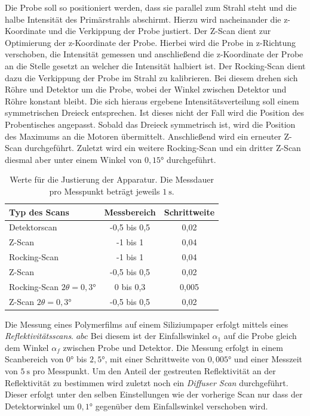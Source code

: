 Die Probe soll so positioniert werden, dass sie parallel zum Strahl steht und die halbe Intensität des Primärstrahls abschirmt.
Hierzu wird nacheinander die z-Koordinate und die Verkippung der Probe justiert.
Der Z-Scan dient zur Optimierung der z-Koordinate der Probe.
Hierbei wird die Probe in z-Richtung verschoben, die Intensität gemessen und anschließend die z-Koordinate der Probe an die Stelle gesetzt an welcher die Intensität halbiert ist.
Der Rocking-Scan dient dazu die Verkippung der Probe im Strahl zu kalibrieren.
Bei diesem drehen sich Röhre und Detektor um die Probe, wobei der Winkel zwischen Detektor und Röhre konstant bleibt.
Die sich hieraus ergebene Intensitätsverteilung soll einem symmetrischen Dreieck entsprechen.
Ist dieses nicht der Fall wird die Position des Probentisches angepasst.
Sobald das Dreieck symmetrisch ist, wird die Position des Maximums an die Motoren übermittelt.
Anschließend wird ein erneuter Z-Scan durchgeführt.
Zuletzt wird ein weitere Rocking-Scan und ein dritter Z-Scan diesmal aber unter einem Winkel von $0,15°$ durchgeführt.
\begin{table}[H]
    \centering
    \caption{Werte für die Justierung der Apparatur. Die Messdauer pro Messpunkt beträgt jeweils $\SI{1}{\s}$.}
    \label{tab:ttab1}
    \begin{tabular}{l c c }
        \toprule
        {Typ des Scans} & {Messbereich} & {Schrittweite}\\
        \midrule
        Detektorscan                    & -0,5 bis 0,5   & 0,02 \\
        Z-Scan                          & -1 bis 1       & 0,04 \\
        Rocking-Scan                    & -1 bis 1       & 0,04 \\
        Z-Scan                          & -0,5 bis 0,5   & 0,02 \\
        Rocking-Scan $2\theta = 0,3°$   & 0 bis 0,3      & 0,005\\
        Z-Scan $2\theta = 0,3°$         & -0,5 bis 0,5   & 0,02 \\
        \bottomrule
    \end{tabular}
\end{table}

Die Messung eines Polymerfilms auf einem Siliziumpaper erfolgt mittels eines \textit{Reflektivitätsscans}.
$abc$
Bei diesem ist der Einfallswinkel $\alpha_1$ auf die Probe gleich dem Winkel $\alpha_f$ zwischen Probe und Detektor.
Die Messung erfolgt in einem Scanbereich von $0°$ bis $2,5°$, mit einer Schrittweite von $0,005°$ und einer Messzeit von $\SI{5}{\s}$ pro Messpunkt.
Um den Anteil der gestreuten Reflektivität an der Reflektivität zu bestimmen wird zuletzt noch ein \textit{Diffuser Scan} durchgeführt.
Dieser erfolgt unter den selben Einstellungen wie der vorherige Scan nur dass der Detektorwinkel um $0,1°$ gegenüber dem Einfallswinkel verschoben wird.
